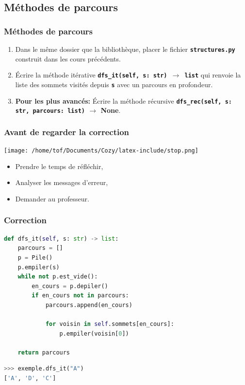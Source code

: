 \documentclass[svgnames,11pt]{beamer}
\begin{document}
\subsection{Méthodes de parcours}
\begin{frame}
    \frametitle{Méthodes de parcours}
\begin{activite}
\begin{enumerate}
    \item Dans le même dossier que la bibliothèque, placer le fichier \textbf{\texttt{structures.py}} construit dans les cours précédents.
    \item Écrire la méthode itérative \textbf{\texttt{dfs\_it(self, s: str) $\rightarrow$ list}} qui renvoie la liste des sommets visités depuis \textbf{\texttt{s}} avec un parcours en profondeur.
    \item \textbf{Pour les plus avancés:} Écrire la méthode récursive \textbf{\texttt{dfs\_rec(self, s: str, parcours: list)} $\rightarrow$ None}.
\end{enumerate}
\end{activite}
    
\end{frame}
\begin{frame}
    \frametitle{Avant de regarder la correction}
\begin{center}
    \centering
    \texttt{[image: /home/tof/Documents/Cozy/latex-include/stop.png]}
    \end{center}
{\Large
    \begin{itemize}
        \item Prendre le temps de réfléchir,
        \item Analyser les messages d'erreur,
        \item Demander au professeur.
    \end{itemize}
}
\end{frame}
\begin{frame}[fragile]
    \frametitle{Correction}

\begin{center}
\begin{lstlisting}[language=Python , basicstyle=\ttfamily\small, xleftmargin=0.2em, xrightmargin=0em]
def dfs_it(self, s: str) -> list:
    parcours = []
    p = Pile()
    p.empiler(s)
    while not p.est_vide():
        en_cours = p.depiler()
        if en_cours not in parcours:
            parcours.append(en_cours)
            
            for voisin in self.sommets[en_cours]:
                p.empiler(voisin[0])
                
    return parcours
\end{lstlisting}
\begin{lstlisting}[language=Python , basicstyle=\ttfamily\small, xleftmargin=0.2em, xrightmargin=0em]
>>> exemple.dfs_it("A")
['A', 'D', 'C']
\end{lstlisting}
\end{center}  

\end{frame}
\end{document}
